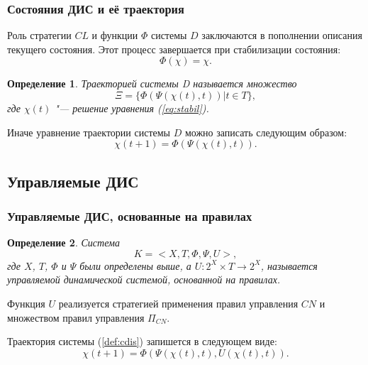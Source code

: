 \documentclass[default]{beamer}
\newtheorem{Def}{Определение}
\begin{document}
	\begin{frame}
		\frametitle{Состояния ДИС и её траектория}
		
		Роль стратегии $CL$ и функции $\Phi$ системы $D$ заключаются в пополнении описания текущего состояния. Этот процесс завершается при стабилизации состояния:
		\begin{equation}\label{eq:stabil}
			\Phi(\chi)=\chi.
		\end{equation}
		\begin{Def}
			Траекторией системы  D называется множество
			\begin{equation}
				\Xi=\{\Phi(\Psi(\chi(t),t))|t\in T\},
			\end{equation}
			где $\chi(t)$ "--- решение уравнения (\ref{eq:stabil}).
		\end{Def}
		
		Иначе уравнение траектории системы $D$ можно записать следующим образом:
		\begin{equation}
			\chi(t+1)=\Phi(\Psi(\chi(t),t)).
		\end{equation}
	\end{frame}

	\subsection{Управляемые ДИС}

	\begin{frame}
		\frametitle{Управляемые ДИС, основанные на правилах}
		
		\begin{Def}
			Система
			\begin{equation}\label{def:cdis}
				K=<X,T,\Phi,\Psi,U>,
			\end{equation}
			где $X$, $T$, $\Phi$ и $\Psi$ были определены выше, а $U: 2^X\times T \rightarrow 2^X$, называется управляемой динамической системой, основанной на правилах. 
		\end{Def}
		
		Функция $U$ реализуется стратегией применения правил управления $CN$ и множеством правил управления $\Pi_{CN}$.
		
		Траектория системы (\ref{def:cdis}) запишется в следующем виде:
		\begin{equation}\label{eq:vosm}
			\chi(t+1)=\Phi(\Psi(\chi(t),t),U(\chi(t),t)).
		\end{equation}
	\end{frame}
\end{document}
